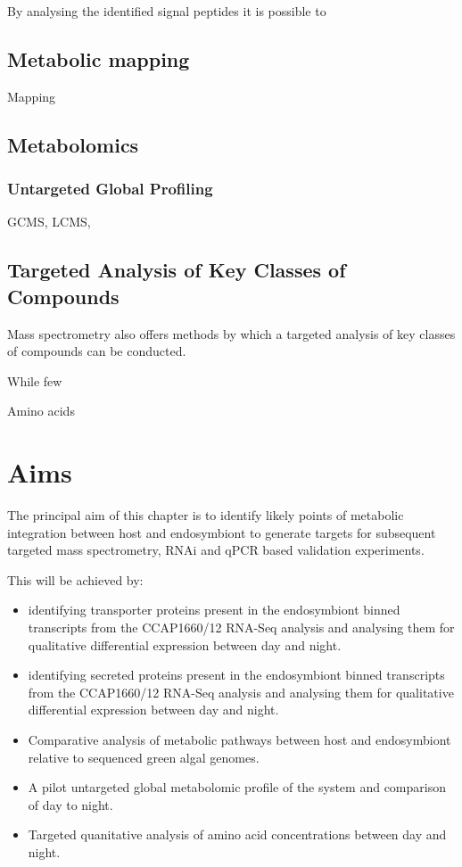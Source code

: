 By analysing the identified signal peptides it is possible
to 






    








\subsection{Metabolic mapping}


Mapping 


\subsection{Metabolomics}

\subsubsection{Untargeted Global Profiling}
GCMS, LCMS,

\subsection{Targeted Analysis of Key Classes of Compounds}

Mass spectrometry also offers methods by which a targeted 
analysis of key classes of compounds can be conducted. 


While few

Amino acids 



\section{Aims}

The principal aim of this chapter is to identify
likely points of metabolic integration between host and 
endosymbiont to generate targets for subsequent 
targeted mass spectrometry, RNAi and qPCR based validation
experiments. 

This will be achieved by:
\begin{itemize}
\item identifying
    transporter proteins present in the endosymbiont
    binned transcripts from the CCAP1660/12 RNA-Seq analysis
    and analysing them for qualitative differential 
    expression between day and night. 
\item identifying
    secreted proteins present in the endosymbiont
    binned transcripts from the CCAP1660/12 RNA-Seq analysis
    and analysing them for qualitative differential 
    expression between day and night. 
\item Comparative analysis of metabolic pathways 
    between host and endosymbiont relative to 
    sequenced green algal genomes. 
\item A pilot untargeted global metabolomic profile of the 
    system and comparison of day to night.
\item Targeted quanitative analysis of amino acid concentrations
    between day and night. 
\end{itemize}

